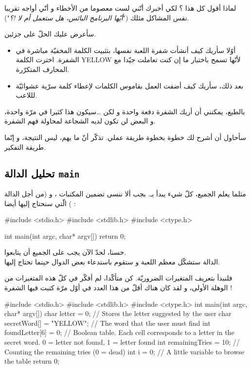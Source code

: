 لماذا أقول كل هذا ؟ لكي أخبرك أنّني لست معصوما من الأخطاء و أنّي أواجه تقريبا نفس المشاكل مثلك
("\textit{أيّها البرنامج البائس، هل ستعمل أم لا !؟}").

سأعرض عليك الحلّ على جزئين.

\begin{itemize}
  \item أوّلا سأريك كيف أنشأت شفرة اللعبة نفسها، بتثبيت الكلمة المخفيّة مباشرة في الشفرة. اخترت الكلمة
\textenglish{YELLOW}
لأنّها تسمح باختبار ما إن كنت تعاملت جيّدا مع المحارف المتكرّرة.
  \item بعد ذلك، سأريك كيف أضفت العمل بقاموس الكلمات لإعطاء كلمة سرّية عشوائيّة لللاعب.
\end{itemize}

بالطبع، يمكنني أن أريك الشفرة دفعة واحدة و لكن \dots سيكون هذا كثيرا في مرّة واحدة، و البعض لن تكون لديه الشجاعة لمحاولة فهم الشفرة.

سأحاول أن أشرح لك خطوة بخطوة طريقة عملي. تذكّر أنّ ما يهم، ليس النتيجة، و إنّما طريقة التفكير.

\subsection{تحليل الدالة \texttt{main}}

مثلما يعلم الجميع، كلّ شيء يبدأ بـ.
بجب ألا ننسى تضمين المكتبات
،
و
(من أجل الدالة
)
الّتي سنحتاج إليها أيضا :

\begin{Csource}
#include <stdio.h>
#include <stdlib.h>
#include <ctype.h>

int main(int argc, char* argv[])
{
  return 0;
}
\end{Csource}

حسنا، لحدّ الآن يجب على الجميع أن يتابعوا.\\
الدالة
ستشكّل معظم اللعبة و ستقوم باستدعاء بعض الدوال حينما تحتاج إليها.

فلنبدأ بتعريف المتغيرات الضروريّة. كن متأكّدا، لم أفكّر في كلّ هذه المتغيرات من الوهلة الأولى، و لقد كان هناك أقلّ من هذا العدد في أوّل مرّة كتبت فيها الشفرة !

\begin{Csource}
#include <stdio.h>
#include <stdlib.h>
#include <ctype.h>
int main(int argc, char* argv[])
{
  char letter = 0; // Stores the letter suggested by the user
  char secretWord[] = "YELLOW"; // The word that the user must find
  int foundLetter[6] = {0}; // Boolean table. Each cell corresponds to a letter in the secret word. 0 = letter not found, 1 = letter found
  int remainingTries = 10; // Counting the remaining tries (0 = dead)
  int i = 0; // A little variable to browse the table
  return 0;
}
\end{Csource}

